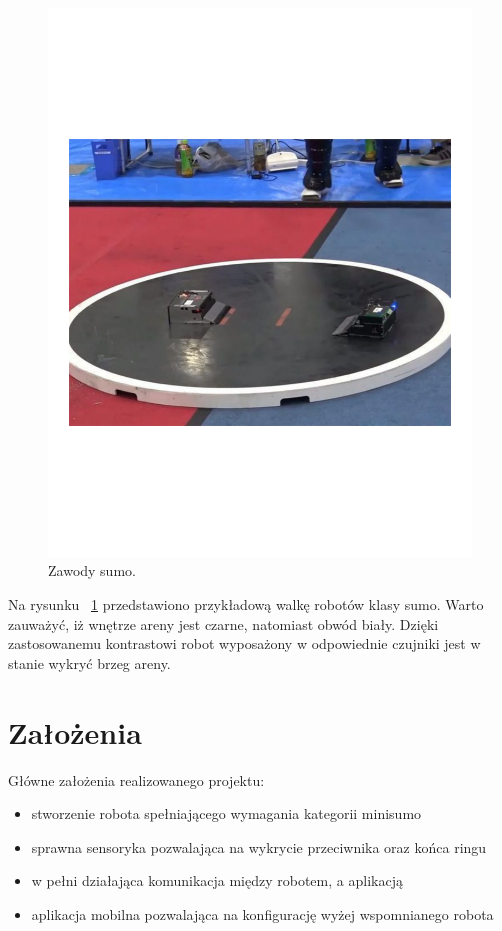 \begin{figure}[ht]
	\centering
		\includegraphics[width=0.7\linewidth]{pic01/sumo_competitions}
	\caption{Zawody sumo.}
	\label{fig:sumo_competitions}	
\end{figure}
Na rysunku ~\ref{fig:sumo_competitions} przedstawiono przykładową walkę robotów klasy sumo. Warto zauważyć, iż  wnętrze areny jest czarne, natomiast obwód biały. Dzięki zastosowanemu kontrastowi robot wyposażony w odpowiednie czujniki jest w stanie wykryć brzeg areny.

\section{Założenia}
Główne założenia realizowanego projektu:
\begin{itemize}
\item stworzenie robota spełniającego wymagania kategorii minisumo
\item sprawna sensoryka pozwalająca na wykrycie przeciwnika oraz końca ringu
\item w pełni działająca komunikacja między robotem, a aplikacją
\item aplikacja mobilna pozwalająca na konfigurację wyżej wspomnianego robota
\end{itemize}
